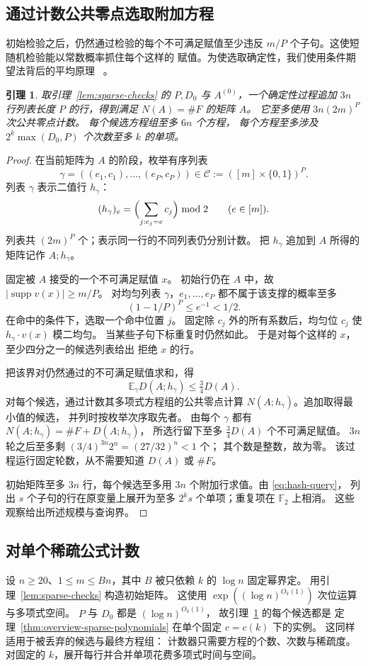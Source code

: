 \documentclass[11pt,reqno]{amsart}
\numberwithin{equation}{section}
\newtheorem{lemma}[theorem]{引理}
\theoremstyle{definition}\newtheorem{definition}[theorem]{定义}
\theoremstyle{remark}\newtheorem{remark}[theorem]{注}
\renewcommand{\le}{\leqslant}
\renewcommand{\ge}{\geqslant}
\begin{document}
\subsection{通过计数公共零点选取附加方程}
初始检验之后，仍然通过检验的每个不可满足赋值至少违反
$m/P$ 个子句。这使短随机检验能以常数概率抓住每个这样的
赋值。为使选取确定性，我们使用条件期望法背后的平均原理
~\cite{Raghavan88}。

\begin{lemma}\label{lem:greedy-hashes}
取引理~\ref{lem:sparse-checks} 的 $P,D_0$ 与
$A^{(0)}$，一个确定性过程追加 $3n$ 行列表长度 $P$
的行，得到满足 $N(A)=\#F$ 的矩阵 $A$。
它至多使用 $3n(2m)^P$ 次公共零点计数。
每个候选方程组至多 $6n$ 个方程，
每个方程至多涉及 $2^k\max(D_0,P)$ 个次数至多 $k$
的单项。
\end{lemma}
\begin{proof}
在当前矩阵为 $A$ 的阶段，枚举有序列表
\[
 \gamma=((e_1,c_1),\ldots,(e_P,c_P))
 \in\mathcal C:=([m]\times\{0,1\})^P.
\]
列表 $\gamma$ 表示二值行 $h_\gamma$：
\[
 (h_\gamma)_e=
 \Bigl(\sum_{j:e_j=e}c_j\Bigr)\bmod2
 \qquad(e\in[m]).
\]
列表共 $(2m)^P$ 个；表示同一行的不同列表仍分别计数。
把 $h_\gamma$ 追加到 $A$ 所得的矩阵记作
$A;h_\gamma$。

固定被 $A$ 接受的一个不可满足赋值 $x$。
初始行仍在 $A$ 中，故
$|\operatorname{supp}v(x)|\ge m/P$。
对均匀列表 $\gamma$，$e_1,\ldots,e_P$
都不属于该支撑的概率至多
\[
 (1-1/P)^P\le e^{-1}<1/2.
\]
在命中的条件下，选取一个命中位置 $j$。
固定除 $c_j$ 外的所有系数后，均匀位 $c_j$
使 $h_\gamma\cdot v(x)$ 模二均匀。
当某些子句下标重复时仍然如此。
于是对每个这样的 $x$，至少四分之一的候选列表给出
拒绝 $x$ 的行。

把该界对仍然通过的不可满足赋值求和，得
\[
 \mathbb E_\gamma D(A;h_\gamma)\le\tfrac34 D(A).
\]
对每个候选，通过计数其多项式方程组的公共零点计算
$N(A;h_\gamma)$。追加取得最小值的候选，
并列时按枚举次序取先者。
由每个 $\gamma$ 都有
$N(A;h_\gamma)=\#F+D(A;h_\gamma)$，
所选行留下至多 $\tfrac34 D(A)$ 个不可满足赋值。
$3n$ 轮之后至多剩
$(3/4)^{3n}2^n=(27/32)^n<1$ 个；
其个数是整数，故为零。
该过程运行固定轮数，从不需要知道 $D(A)$ 或 $\#F$。

初始矩阵至多 $3n$ 行，每个候选至多用 $3n$
个附加行求值。由 \eqref{eq:hash-query}，
列出 $s$ 个子句的行在原变量上展开为至多 $2^k s$
个单项；重复项在 $\mathbb F_2$ 上相消。
这些观察给出所述规模与查询界。
\end{proof}

\subsection{对单个稀疏公式计数}\label{subsec:count-sparse}
设 $n\ge20$、$1\le m\le Bn$，其中 $B$
被只依赖 $k$ 的 $\log n$ 固定幂界定。
用引理~\ref{lem:sparse-checks} 构造初始矩阵。
这使用 $\exp((\log n)^{O_k(1)})$ 次位运算与多项式空间。
$P$ 与 $D_0$ 都是 $(\log n)^{O_k(1)}$，
故引理~\ref{lem:greedy-hashes} 的每个候选都是
定理~\ref{thm:overview-sparse-polynomials}
在单个固定 $c=c(k)$ 下的实例。
这同样适用于被丢弃的候选与最终方程组：
计数器只需要方程的个数、次数与稀疏度。
对固定的 $k$，展开每行并合并单项花费多项式时间与空间。
\end{document}
